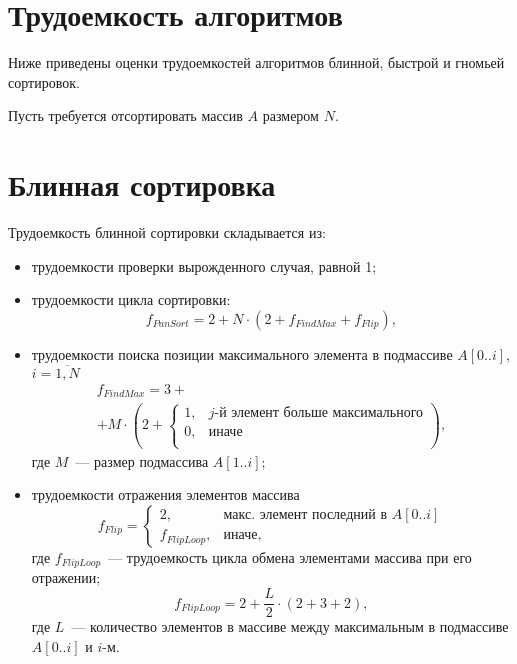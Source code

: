 \section{Трудоемкость алгоритмов}

Ниже приведены оценки трудоемкостей алгоритмов блинной, быстрой и гномьей сортировок.

Пусть требуется отсортировать массив $A$ размером $N$.

\section{Блинная сортировка}

Трудоемкость блинной сортировки складывается из:
\begin{itemize}
    \item трудоемкости проверки вырожденного случая, равной 1;
    \item трудоемкости цикла сортировки:
    \begin{equation}
        f_{PanSort} = 2 + N \cdot (2 + f_{FindMax} + f_{Flip}),
    \end{equation}
    \item трудоемкости поиска позиции максимального элемента в подмассиве $A[0..i]$, $i = \overline{1, N}$
    \begin{equation}
        \begin{gathered}
            f_{FindMax} = 3 + \\ + M \cdot \left ( 2 +
            \begin{cases}
                1, & \text{$j$-й элемент больше максимального}\\
                0, & \text{иначе}\\
            \end{cases} \right ),
        \end{gathered}
    \end{equation}
    где $M$~--- размер подмассива $A[1..i]$;
    \item трудоемкости отражения элементов массива
    \begin{equation}
        f_{Flip} = 
        \begin{cases}
            2, & \text{макс. элемент последний в }A[0..i]\\
            f_{FlipLoop}, & \text{иначе},
        \end{cases}
    \end{equation}
    где $f_{FlipLoop}$~--- трудоемкость цикла обмена элементами массива при его отражении;
    \begin{equation}
        f_{FlipLoop} = 2 + \frac{L}{2} \cdot (2 + 3 + 2),
    \end{equation}
    где $L$~--- количество элементов в массиве между максимальным в подмассиве $A[0..i]$ и $i$-м.
\end{itemize}

